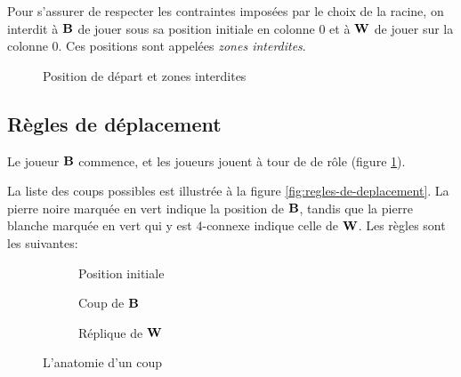 Pour s'assurer de respecter les contraintes imposées par le choix de la racine, on interdit à $\mathbf{B}$ de jouer sous sa position initiale en colonne $0$ et à $\mathbf{W}$ de jouer sur la colonne $0$. Ces positions sont appelées \emph{zones interdites}.

\begin{figure}[H]
\centering
{}

\caption{Position de départ et zones interdites}
\end{figure}

\subsection{Règles de déplacement}
Le joueur $\mathbf{B}$ commence, et les joueurs jouent à tour de de rôle (figure \ref{figure:anatomie-coup}).

La liste des coups possibles est illustrée à la figure \ref{fig:regles-de-deplacement}. La pierre noire marquée en vert indique la position de $\mathbf{B}$, tandis que la pierre blanche marquée en vert qui y est $4$-connexe indique celle de $\mathbf{W}$. Les règles sont les suivantes:

\begin{figure}
\centering
\begin{subfigure}[b]{.3\textwidth}
\centering
{}
\caption{Position initiale}
\end{subfigure}
\begin{subfigure}[b]{.3\textwidth}
\centering
{}
\caption{Coup de $\mathbf{B}$}
\end{subfigure}
\begin{subfigure}[b]{.3\textwidth}
\centering
{}
\caption{Réplique de $\mathbf{W}$}
\end{subfigure}
\caption{L'anatomie d'un coup}\label{figure:anatomie-coup}
\end{figure}




